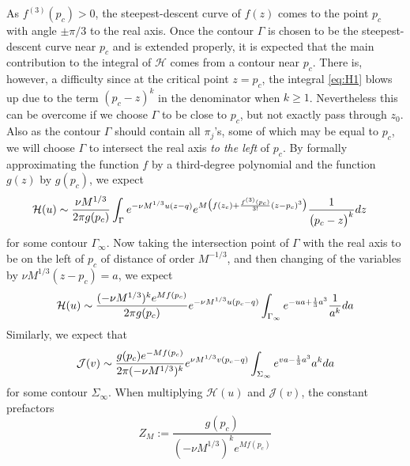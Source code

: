 \documentclass[11pt]{article}
\begin{document}
As $f^{(3)}(p_c)>0$, the steepest-descent curve of $f(z)$ comes to
the point $p_c$ with angle $\pm \pi/3$ to the real axis. Once the
contour $\Gamma$ is chosen to be the steepest-descent curve near
$p_c$ and is extended properly, it is expected that the main
contribution to the integral of $\mathcal{H}$ comes from a contour
near $p_c$. There is, however, a difficulty since at the critical
point $z=p_c$, the integral \eqref{eq:H1} blows up due to the term
$(p_c-z)^k$ in the denominator when $k\ge 1$. Nevertheless this
can be overcome if we choose $\Gamma$ to be close to $p_c$, but
not exactly pass through $z_0$. Also as the contour $\Gamma$
should contain all $\pi_j$'s, some of which may be equal to $p_c$,
we will choose $\Gamma$ to intersect the real axis \emph{to the
left} of $p_c$. By formally approximating the function $f$ by a
third-degree polynomial and the function $g(z)$ by $g(p_c)$, we
expect
\begin{equation}
\begin{split}
  \mathcal{H}(u)
  & \sim
  \frac{\nu M^{1/3}}{2\pi g(p_c)}
  \int_\Gamma  e^{-\nu M^{1/3} u(z-q)} e^{M\bigl(f(z_c)+\frac{f^{(3)}(p_c)}{3!}(z-p_c)^3\bigr)}
  \frac1{\bigl(p_c-z\bigr)^k} dz
\end{split}
\end{equation}
for some contour $\Gamma_\infty$. Now taking the intersection
point of $\Gamma$ with the real axis to be on the left of $p_c$ of
distance of order $M^{-1/3}$, and then changing of the variables
by $\nu M^{1/3} (z-p_c)=a$, we expect
\begin{equation}
\begin{split}
  \mathcal{H}(u)
  \sim
  \frac{(-\nu M^{1/3})^k  e^{Mf(p_c)}}{2\pi g(p_c)}
  e^{-\nu M^{1/3} u(p_c-q)} \int_{\Gamma_\infty}  e^{-ua+\frac13a^3}
  \frac1{a^k} da
\end{split}
\end{equation}
Similarly, we expect that
\begin{equation}
\begin{split}
  \mathcal{J}(v) \sim
  \frac{g(p_c) e^{-Mf(p_c)}}{2\pi (-\nu M^{1/3})^k}
  e^{\nu M^{1/3} v(p_c-q)} \int_{\Sigma_\infty}  e^{va-\frac13a^3} a^k da
\end{split}
\end{equation}
for some contour $\Sigma_\infty$. When multiplying
$\mathcal{H}(u)$ and $\mathcal{J}(v)$, the constant prefactors
\begin{equation}\label{eq:C1}
  Z_M := \frac{g(p_c)}{(-\nu M^{1/3})^k  e^{Mf(p_c)}}
\end{equation}
\end{document}
